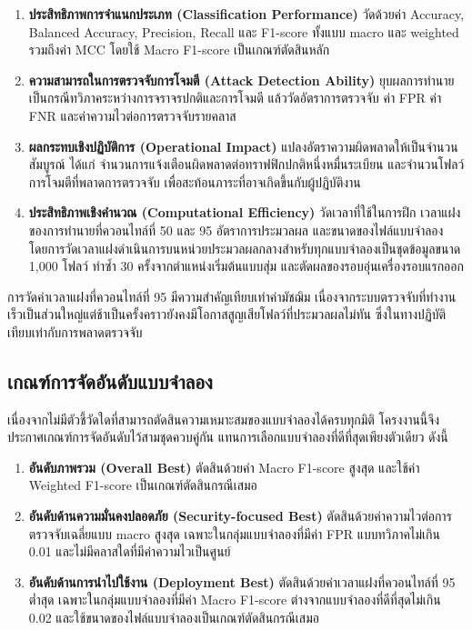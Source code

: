 \begin{enumerate}
    \item \textbf{ประสิทธิภาพการจำแนกประเภท (Classification Performance)} วัดด้วยค่า Accuracy, Balanced Accuracy, Precision, Recall และ F1-score ทั้งแบบ macro และ weighted รวมถึงค่า MCC โดยใช้ Macro F1-score เป็นเกณฑ์ตัดสินหลัก
    \item \textbf{ความสามารถในการตรวจจับการโจมตี (Attack Detection Ability)} ยุบผลการทำนายเป็นกรณีทวิภาคระหว่างการจราจรปกติและการโจมตี แล้ววัดอัตราการตรวจจับ ค่า FPR ค่า FNR และค่าความไวต่อการตรวจจับรายคลาส
    \item \textbf{ผลกระทบเชิงปฏิบัติการ (Operational Impact)} แปลงอัตราความผิดพลาดให้เป็นจำนวนสัมบูรณ์ ได้แก่ จำนวนการแจ้งเตือนผิดพลาดต่อทราฟฟิกปกติหนึ่งหมื่นระเบียน และจำนวนโฟลว์การโจมตีที่พลาดการตรวจจับ เพื่อสะท้อนภาระที่อาจเกิดขึ้นกับผู้ปฏิบัติงาน
    \item \textbf{ประสิทธิภาพเชิงคำนวณ (Computational Efficiency)} วัดเวลาที่ใช้ในการฝึก เวลาแฝงของการทำนายที่ควอนไทล์ที่ 50 และ 95 อัตราการประมวลผล และขนาดของไฟล์แบบจำลอง โดยการวัดเวลาแฝงดำเนินการบนหน่วยประมวลผลกลางสำหรับทุกแบบจำลองเป็นชุดข้อมูลขนาด 1,000 โฟลว์ ทำซ้ำ 30 ครั้งจากตำแหน่งเริ่มต้นแบบสุ่ม และตัดผลของรอบอุ่นเครื่องรอบแรกออก
\end{enumerate}

การวัดค่าเวลาแฝงที่ควอนไทล์ที่ 95 มีความสำคัญเทียบเท่าค่ามัชฌิม เนื่องจากระบบตรวจจับที่ทำงานเร็วเป็นส่วนใหญ่แต่ช้าเป็นครั้งคราวยังคงมีโอกาสสูญเสียโฟลว์ที่ประมวลผลไม่ทัน ซึ่งในทางปฏิบัติเทียบเท่ากับการพลาดตรวจจับ

\subsection{เกณฑ์การจัดอันดับแบบจำลอง}

เนื่องจากไม่มีตัวชี้วัดใดที่สามารถตัดสินความเหมาะสมของแบบจำลองได้ครบทุกมิติ โครงงานนี้จึงประกาศเกณฑ์การจัดอันดับไว้สามชุดควบคู่กัน แทนการเลือกแบบจำลองที่ดีที่สุดเพียงตัวเดียว ดังนี้

\begin{enumerate}
    \item \textbf{อันดับภาพรวม (Overall Best)} ตัดสินด้วยค่า Macro F1-score สูงสุด และใช้ค่า Weighted F1-score เป็นเกณฑ์ตัดสินกรณีเสมอ
    \item \textbf{อันดับด้านความมั่นคงปลอดภัย (Security-focused Best)} ตัดสินด้วยค่าความไวต่อการตรวจจับเฉลี่ยแบบ macro สูงสุด เฉพาะในกลุ่มแบบจำลองที่มีค่า FPR แบบทวิภาคไม่เกิน 0.01 และไม่มีคลาสใดที่มีค่าความไวเป็นศูนย์
    \item \textbf{อันดับด้านการนำไปใช้งาน (Deployment Best)} ตัดสินด้วยค่าเวลาแฝงที่ควอนไทล์ที่ 95 ต่ำสุด เฉพาะในกลุ่มแบบจำลองที่มีค่า Macro F1-score ต่างจากแบบจำลองที่ดีที่สุดไม่เกิน 0.02 และใช้ขนาดของไฟล์แบบจำลองเป็นเกณฑ์ตัดสินกรณีเสมอ
\end{enumerate}

